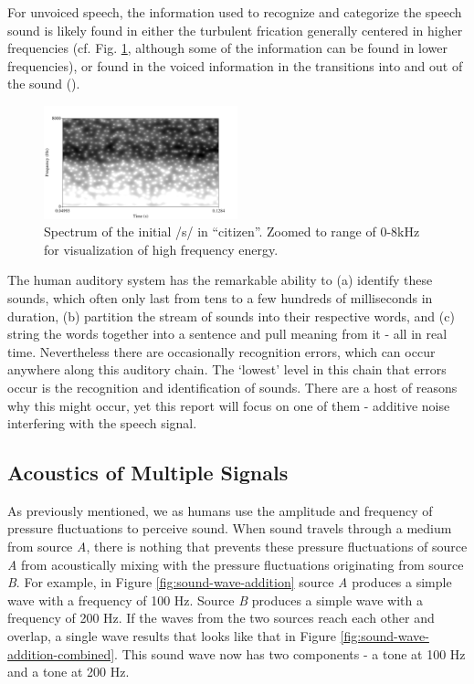 \documentclass[dissertation,copyright]{uathesis}
\begin{document}
For unvoiced speech, the information used to recognize and categorize the speech sound is likely found in either the turbulent frication generally centered in higher frequencies (cf. Fig. \ref{fig:spctgrm_s}, although some of the information can be found in lower frequencies), or found in the voiced information in the transitions into and out of the sound (\cite{willi:17}).
%
\begin{figure}
\centering
  \includegraphics[width=0.5\textwidth]{figure/spctgrm_s.png}
  \caption{Spectrum of the initial /s/ in ``citizen''. Zoomed to range of 0-8kHz for visualization of high frequency energy.}
  \label{fig:spctgrm_s}
\end{figure}

The human auditory system has the remarkable ability to (a) identify these sounds, which often only last from tens to a few hundreds of milliseconds in duration, (b) partition the stream of sounds into their respective words, and (c) string the words together into a sentence and pull meaning from it - all in real time.  Nevertheless there are occasionally recognition errors, which can occur anywhere along this auditory chain.  The `lowest' level in this chain that errors occur is the recognition and identification of sounds.  There are a host of reasons why this might occur, yet this report will focus on one of them - additive noise interfering with the speech signal.

\subsection{Acoustics of Multiple Signals}

As previously mentioned, we as humans use the amplitude and frequency of pressure fluctuations to perceive sound. When sound travels through a medium from source \textit{A}, there is nothing that prevents these pressure fluctuations of source \textit{A} from acoustically mixing with the pressure fluctuations originating from source \textit{B}.  For example, in Figure \ref{fig:sound-wave-addition} source \textit{A} produces a simple wave with a frequency of 100 Hz.  Source \textit{B} produces a simple wave with a frequency of 200 Hz.  If the waves from the two sources reach each other and overlap, a single wave results that looks like that in Figure \ref{fig:sound-wave-addition-combined}.  This sound wave now has two components - a tone at 100 Hz and a tone at 200 Hz.
\end{document}
